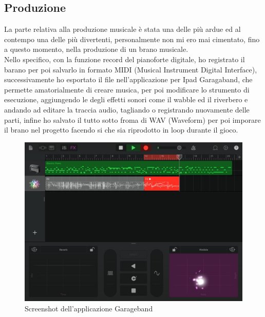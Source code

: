 \documentclass[italian,12pt,a4paper]{article}
\begin{document}
	\subsection{Produzione}
	La parte relativa alla produzione musicale è stata una delle più ardue ed al contempo una delle più divertenti, personalmente non mi ero mai cimentato, fino a questo momento, nella produzione di un brano musicale.\\
	\linebreak
	Nello specifico, con la funzione record del pianoforte digitale, ho registrato il barano per poi salvarlo in formato MIDI (Musical Instrument Digital Interface), successivamente ho esportato il file nell'applicazione per Ipad Garagaband, che permette amatorialmente di creare musica, per poi modificare lo strumento di esecuzione, aggiungendo le degli effetti sonori come il wabble ed il riverbero e andando ad editare la traccia audio, tagliando o registrando nuovamente delle parti, infine ho salvato il tutto sotto froma di WAV (Waveform) per poi imporare il brano nel progetto facendo si che sia riprodotto in loop durante il gioco. 
	
	\begin{figure}[!h]
		\centering
		\includegraphics[width=14cm]{garageband.jpg}
		\caption{Screenshot dell'applicazione Garageband}
		\label{fig:musica}
	\end{figure}
	
	
\end{document}

